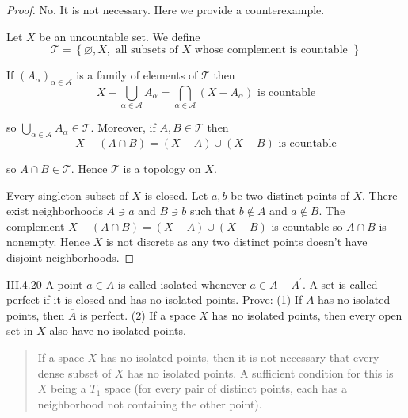 \begin{proof}
    No. It is not necessary. Here we provide a counterexample.

    Let \(X\) be an uncountable set. We define
    \[
        \mathscr{T} = \left\{ \varnothing, X, \text{ all subsets of \(X\) whose complement is countable } \right\}
    \]

    If \( {(A_{\alpha})}_{\alpha\in \mathscr{A}} \) is a family of elements of \( \mathscr{T} \) then
    \[
        X - \bigcup_{\alpha\in\mathscr{A}} A_{\alpha} = \bigcap_{\alpha\in\mathscr{A}}(X - A_{\alpha}) \text{ is countable}
    \]

    so \( \bigcup_{\alpha\in\mathscr{A}} A_{\alpha} \in \mathscr{T} \). Moreover, if \( A, B \in \mathscr{T} \) then
    \[
        X - (A \cap B) = (X - A) \cup (X - B) \text{ is countable}
    \]

    so \( A \cap B \in \mathscr{T} \). Hence \( \mathscr{T} \) is a topology on \(X\).

    Every singleton subset of \(X\) is closed. Let \(a, b\) be two distinct points of \(X\). There exist neighborhoods \(A \ni a\) and \(B \ni b\) such that \(b \notin A\) and \(a \notin B\). The complement \( X - (A \cap B) = (X - A) \cup (X - B) \) is countable so \( A \cap B \) is nonempty. Hence \( X \) is not discrete as any two distinct points doesn't have disjoint neighborhoods.
\end{proof}

\begin{problem}{III.4.20}
A point \(a \in A\) is called isolated whenever \(a \in A - A^{\prime}\). A set is called perfect if it is closed and has no isolated points. Prove: (1) If \(A\) has no isolated points, then \(\overline{A}\) is perfect. (2) If a space \(X\) has no isolated points, then every open set in \(X\) also have no isolated points.
\end{problem}

\begin{quotation}
    If a space \(X\) has no isolated points, then it is not necessary that every dense subset of \(X\) has no isolated points. A sufficient condition for this is \(X\) being a \(T_{1}\) space (for every pair of distinct points, each has a neighborhood not containing the other point).
\end{quotation}

